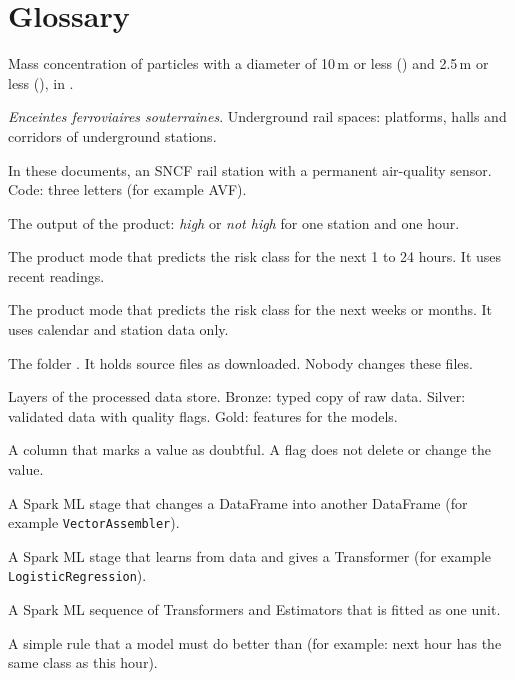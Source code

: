 \section*{Glossary}
\begingroup\raggedright
\begin{description}[style=nextline,leftmargin=1.5em,font=\sffamily\bfseries]
  \item[\pmten, \pmtwofive] Mass concentration of particles with a diameter of 10\,\textmu m or less (\pmten) and 2.5\,\textmu m or less (\pmtwofive), in \ugm.
  \item[EFS] \emph{Enceintes ferroviaires souterraines}. Underground rail spaces: platforms, halls and corridors of underground stations.
  \item[Station] In these documents, an SNCF rail station with a permanent air-quality sensor. Code: three letters (for example AVF).
  \item[Risk class] The output of the product: \emph{high} or \emph{not high} for one station and one hour.
  \item[Short-term mode] The product mode that predicts the risk class for the next 1 to 24 hours. It uses recent readings.
  \item[Outlook mode] The product mode that predicts the risk class for the next weeks or months. It uses calendar and station data only.
  \item[Raw zone] The folder . It holds source files as downloaded. Nobody changes these files.
  \item[Bronze, Silver, Gold] Layers of the processed data store. Bronze: typed copy of raw data. Silver: validated data with quality flags. Gold: features for the models.
  \item[Flag] A column that marks a value as doubtful. A flag does not delete or change the value.
  \item[Transformer] A Spark ML stage that changes a DataFrame into another DataFrame (for example \texttt{VectorAssembler}).
  \item[Estimator] A Spark ML stage that learns from data and gives a Transformer (for example \texttt{LogisticRegression}).
  \item[Pipeline] A Spark ML sequence of Transformers and Estimators that is fitted as one unit.
  \item[Baseline] A simple rule that a model must do better than (for example: next hour has the same class as this hour).

\end{description}
